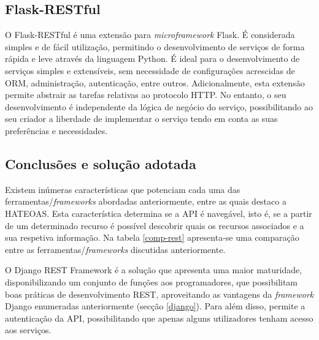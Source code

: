 \subsection{Flask-RESTful}

O Flask-RESTful é uma extensão para \textit{microframework} Flask. É considerada simples e de fácil utilização, permitindo o desenvolvimento de serviços de forma rápida e leve através da linguagem Python. É ideal para o desenvolvimento de serviços simples e extensíveis, sem necessidade de configurações acrescidas de \ac{ORM}, administração,  autenticação, entre outros\cite{Flask-RESTful2017}.  Adicionalmente, esta extensão permite abstrair as tarefas relativas ao protocolo \ac{HTTP}. No entanto, o seu desenvolvimento é independente da lógica de negócio do serviço, possibilitando ao seu criador a liberdade de implementar o serviço tendo em conta as suas preferências e necessidades.  

\subsection{Conclusões e solução adotada}

Existem inúmeras características que potenciam cada uma das ferramentas/\textit{frameworks} abordadas anteriormente, entre as quais destaco a \ac{HATEOAS}. Esta característica determina se a API é  navegável, isto é, se a partir de um determinado recurso é possível descobrir quais os recursos associados e a sua respetiva informação. Na tabela \ref{comp-rest} apresenta-se uma comparação entre as ferramentas/\textit{frameworks} discutidas anteriormente. 

O Django REST Framework é a solução que apresenta uma maior maturidade, disponibilizando um conjunto de funções aos programadores, que possibilitam boas práticas de desenvolvimento \ac{REST}, aproveitando as vantagens da \textit{framework} Django enumeradas anteriormente (secção \ref{django}). Para além disso, permite a autenticação da API, possibilitando que apenas alguns utilizadores tenham acesso aos serviços. 


